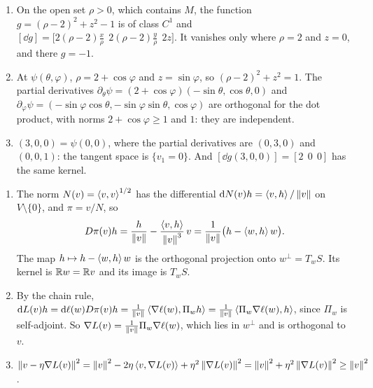 \begin{enumerate}[nosep]
  \item On the open set $\rho > 0$, which contains $M$, the function
        $g = (\rho - 2)^2 + z^2 - 1$ is of class $C^1$ and
        $[\dd g] = \bigl[2(\rho - 2)\frac x\rho\ \
        2(\rho - 2)\frac y\rho\ \ 2z\bigr]$. It vanishes only where
        $\rho = 2$ and $z = 0$, and there $g = -1$.
  \item At $\psi(\theta, \varphi)$, $\rho = 2 + \cos\varphi$ and
        $z = \sin\varphi$, so $(\rho - 2)^2 + z^2 = 1$. The partial
        derivatives
        $\partial_\theta\psi = (2 + \cos\varphi)(-\sin\theta, \cos\theta, 0)$
        and
        $\partial_\varphi\psi = (-\sin\varphi\cos\theta,
        -\sin\varphi\sin\theta, \cos\varphi)$ are orthogonal for the dot
        product, with norms $2 + \cos\varphi\geq1$ and $1$: they are
        independent.
  \item $(3, 0, 0) = \psi(0, 0)$, where the partial derivatives are
        $(0, 3, 0)$ and $(0, 0, 1)$: the tangent space is
        $\{v_1 = 0\}$. And $[\dd g(3, 0, 0)] = [2\ \ 0\ \ 0]$ has the
        same kernel.
\end{enumerate}

\begin{enumerate}[nosep]
  \item The norm $N(v) = \left\langle v, v \right\rangle^{1/2}$ has the differential
        $\mathrm{d} N(v)h = \left\langle v, h \right\rangle/\left\|v\right\|$ on $V\setminus\{0\}$, and
        $\pi = v/N$, so
        \[
          D\pi(v)h = \frac h{\left\|v\right\|} - \frac{\left\langle v, h \right\rangle}{\left\|v\right\|^3}\,v
          = \frac1{\left\|v\right\|}\bigl(h - \left\langle w, h \right\rangle w\bigr) .
        \]
        The map $h\mapsto h - \left\langle w, h \right\rangle w$ is the orthogonal projection
        onto $w^\perp = T_wS$. Its kernel is $\mathbb{R} w = \mathbb{R} v$ and its image
        is $T_wS$.
  \item By the chain rule,
        $\mathrm{d} L(v)h = \mathrm{d}\ell(w)D\pi(v)h
        = \frac1{\left\|v\right\|}\left\langle \nabla\ell(w), \Pi_wh \right\rangle
        = \frac1{\left\|v\right\|}\left\langle \Pi_w\nabla\ell(w), h \right\rangle$, since $\Pi_w$ is
        self-adjoint. So $\nabla L(v) = \frac1{\left\|v\right\|}\Pi_w\nabla\ell(w)$,
        which lies in $w^\perp$ and is orthogonal to $v$.
  \item $\left\|v - \eta\nabla L(v)\right\|^2 = \left\|v\right\|^2
        - 2\eta\left\langle v, \nabla L(v) \right\rangle + \eta^2\left\|\nabla L(v)\right\|^2
        = \left\|v\right\|^2 + \eta^2\left\|\nabla L(v)\right\|^2\geq\left\|v\right\|^2$.
\end{enumerate}

